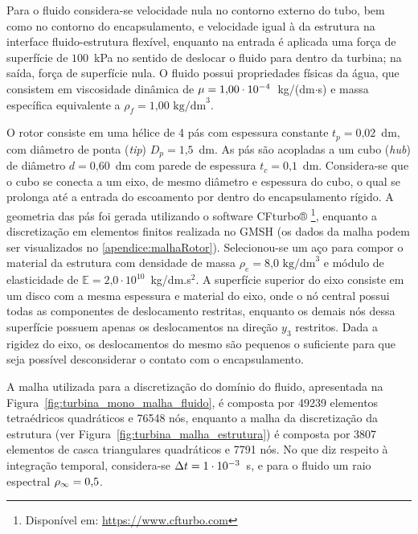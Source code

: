 Para o fluido considera-se velocidade nula no contorno externo do tubo, bem como no contorno do encapsulamento, e velocidade igual à da estrutura na interface fluido-estrutura flexível, enquanto na entrada é aplicada uma força de superfície de $100$~kPa no sentido de deslocar o fluido para dentro da turbina; na saída, força de superfície nula. O fluido possui propriedades físicas da água, que consistem em viscosidade dinâmica de $\mu=1\text{,}00\cdot10^{-4}$~kg/(dm$\cdot$s) e massa específica equivalente a $\rho_{f} = 1\text{,}00 \text{ kg/dm}^3$.

O rotor consiste em uma hélice de 4 pás com espessura constante $t_p = 0\text{,}02$~dm, com diâmetro de ponta (\textit{tip}) $D_{p}=1\text{,}5$~dm. As pás são acopladas a um cubo (\textit{hub}) de diâmetro $d=0\text{,}60$~dm com parede de espessura $t_c = 0\text{,}1$~dm. Considera-se que o cubo se conecta a um eixo, de mesmo diâmetro e espessura do cubo, o qual se prolonga até a entrada do escoamento por dentro do encapsulamento rígido. A geometria das pás foi gerada utilizando o software CFturbo® \footnote{Disponível em: \url{https://www.cfturbo.com}}, enquanto a discretização em elementos finitos realizada no GMSH (os dados da malha podem ser visualizados no \autoref{apendice:malhaRotor}). Selecionou-se um aço para compor o material da estrutura com densidade de massa $\rho_{e} =  8\text{,}0 \text{ kg/dm}^3 $ e módulo de elasticidade de $\mathbb{E} = 2\text{,}0\cdot10^{10}$~kg/dm.s$^2$. A superfície superior do eixo consiste em um disco com a mesma espessura e material do eixo, onde o nó central possui todas as componentes de deslocamento restritas, enquanto os demais nós dessa superfície possuem apenas os deslocamentos na direção $y_3$ restritos. Dada a rigidez do eixo, os deslocamentos do mesmo são pequenos o suficiente para que seja possível desconsiderar o contato com o encapsulamento.

A malha utilizada para a discretização do domínio do fluido, apresentada na Figura~\ref{fig:turbina_mono_malha_fluido}, é composta por 49239 elementos tetraédricos quadráticos e 76548 nós, enquanto a malha da discretização da estrutura (ver Figura~\ref{fig:turbina_malha_estrutura}) é composta por 3807 elementos de casca triangulares quadráticos e 7791 nós. No que diz respeito à integração temporal, considera-se $\Delta t = 1\cdot10^{-3}$~s, e para o fluido um raio espectral $\rho_\infty = 0\text{,}5$.


